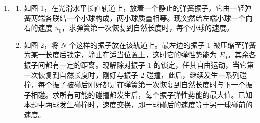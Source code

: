 \documentclass[\gkver]{gaokaozhenti}
\begin{document}
\begin{enumerate}
\item
\begin{enumerate}
	\item
	如图 1，在光滑水平长直轨道上，放着一个静止的弹簧振子，它由一轻弹簧两端各联结一个小球构成，两小球质量相等。现突然给左端小球一个向右的速度 $u_{0}$，求弹簧第一次恢复到自然长度时，每个小球的速度。
	\item
	如图 2，将 $N$ 个这样的振子放在该轨道上。最左边的振子 1 被压缩至弹簧为某一长度后锁定，静止在适当位置上，这时它的弹性势能为 $E_{0}$。其余各振子间都有一定的距离。现解除对振子 1 的锁定，任其自由运动，当它第一次恢复到自然长度时，刚好与振子 2 碰撞，此后，继续发生一系列碰撞，每个振子被碰后刚好都是在弹簧第一次恢复到自然长度时与下一个振子相碰。求所有可能的碰撞都发生后，每个振子弹性势能的最大值。已知本题中两球发生碰撞时，速度交换，即一球碰后的速度等于另一球碰前的速度。
\end{enumerate}
\end{enumerate}
\end{document}
